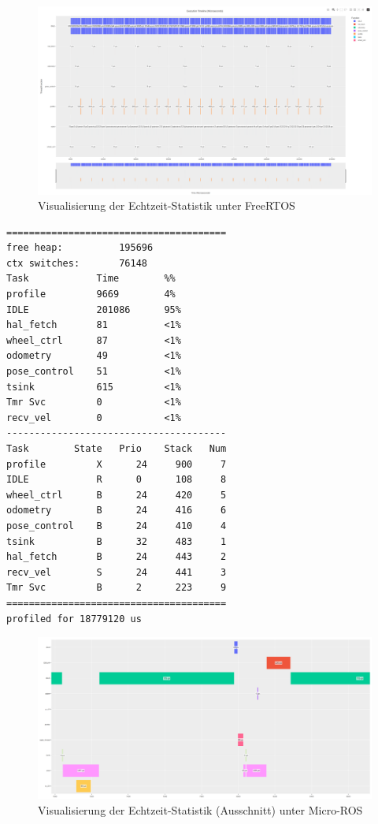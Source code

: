\begin{figure}[h]
    \centering
    \includegraphics[width=1\textwidth]{assets/freertos_profiling}
    \caption{Visualisierung der Echtzeit-Statistik unter FreeRTOS}
\end{figure}

\begin{code}
\begin{verbatim}
=======================================
free heap:          195696
ctx switches:       76148
Task            Time        %%
profile         9669        4%
IDLE            201086      95%
hal_fetch       81          <1%
wheel_ctrl      87          <1%
odometry        49          <1%
pose_control    51          <1%
tsink           615         <1%
Tmr Svc         0           <1%
recv_vel        0           <1%
---------------------------------------
Task        State   Prio    Stack   Num
profile         X      24     900     7
IDLE            R      0      108     8
wheel_ctrl      B      24     420     5
odometry        B      24     416     6
pose_control    B      24     410     4
tsink           B      32     483     1
hal_fetch       B      24     443     2
recv_vel        S      24     441     3
Tmr Svc         B      2      223     9
=======================================
profiled for 18779120 us
\end{verbatim}
\end{code}

\begin{figure}[h]
    \centering
    \includegraphics[width=1\textwidth]{assets/micro_ros_profiling_ausschnitt_cache_enabled}
    \caption{Visualisierung der Echtzeit-Statistik (Ausschnitt) unter Micro-ROS}
\end{figure}

